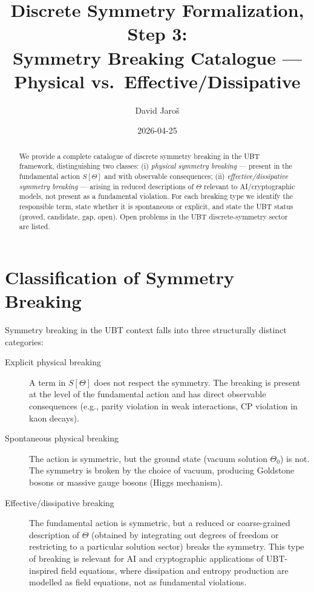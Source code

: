 \documentclass[12pt,a4paper]{article}
\title{\textbf{Discrete Symmetry Formalization, Step 3:\\
                 Symmetry Breaking Catalogue ---\\
                 Physical vs.\ Effective/Dissipative}}
\author{David Jaro\v{s}}
\date{2026-04-25}
\theoremstyle{definition}
\theoremstyle{remark}
\begin{document}
  \maketitle

  \begin{abstract}
  We provide a complete catalogue of discrete symmetry breaking in the UBT
  framework, distinguishing two classes:
  (i) \emph{physical symmetry breaking} --- present in the fundamental action
  $S[\Theta]$ and with observable consequences;
  (ii) \emph{effective/dissipative symmetry breaking} --- arising in reduced
  descriptions of $\Theta$ relevant to AI/cryptographic models,
  not present as a fundamental violation.
  For each breaking type we identify the responsible term, state whether it is
  spontaneous or explicit, and state the UBT status (proved, candidate,
  gap, open).
  Open problems in the UBT discrete-symmetry sector are listed.
  \end{abstract}
\fi

\section{Classification of Symmetry Breaking}
\label{sec:cat:classification}

Symmetry breaking in the UBT context falls into three structurally distinct
categories:

\begin{description}
  \item[Explicit physical breaking]
    A term in $S[\Theta]$ does not respect the symmetry.  The breaking is
    present at the level of the fundamental action and has direct observable
    consequences (e.g., parity violation in weak interactions, CP violation
    in kaon decays).
  \item[Spontaneous physical breaking]
    The action is symmetric, but the ground state (vacuum solution $\Theta_0$)
    is not.  The symmetry is broken by the choice of vacuum, producing Goldstone
    bosons or massive gauge bosons (Higgs mechanism).
  \item[Effective/dissipative breaking]
    The fundamental action is symmetric, but a reduced or coarse-grained
    description of $\Theta$ (obtained by integrating out degrees of freedom or
    restricting to a particular solution sector) breaks the symmetry.
    This type of breaking is relevant for AI and cryptographic applications
    of UBT-inspired field equations, where dissipation and entropy production
    are modelled as field equations, not as fundamental violations.
\end{description}
\end{document}

